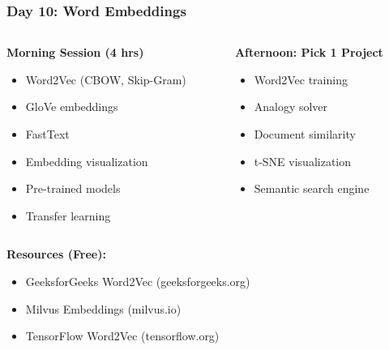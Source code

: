 \begin{frame}[fragile]\frametitle{Day 10: Word Embeddings}
\begin{columns}
    \begin{column}[T]{0.5\linewidth}
      \textbf{Morning Session (4 hrs)}
      \begin{itemize}
        \item Word2Vec (CBOW, Skip-Gram)
        \item GloVe embeddings
        \item FastText
        \item Embedding visualization
        \item Pre-trained models
        \item Transfer learning
      \end{itemize}
    \end{column}
    \begin{column}[T]{0.5\linewidth}
      \textbf{Afternoon: Pick 1 Project}
      \begin{itemize}
        \item Word2Vec training
        \item Analogy solver
        \item Document similarity
        \item t-SNE visualization
        \item Semantic search engine
      \end{itemize}
    \end{column}
  \end{columns}
  
  \vspace{0.3cm}
  \textbf{Resources (Free):}
  \begin{itemize}
    \item GeeksforGeeks Word2Vec (geeksforgeeks.org)
    \item Milvus Embeddings (milvus.io)
    \item TensorFlow Word2Vec (tensorflow.org)
  \end{itemize}
\end{frame}


